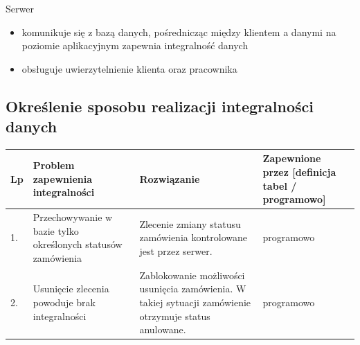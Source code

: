 \documentclass[10pt,a4paper]{article}
\begin{document}
		Serwer
		\begin{itemize}
		  \item komunikuje się z bazą danych, pośrednicząc między klientem a danymi
			 	na poziomie aplikacyjnym zapewnia integralność danych
		  \item obsługuje uwierzytelnienie klienta oraz pracownika
		\end{itemize}

		\newpage
		\subsection{Określenie sposobu realizacji integralności danych}
	    \flushleft
  		\begin{longtable}{| p{0.5cm} | p{4cm} | p{6cm} | p{2cm} |}
  \hline
  Lp & Problem zapewnienia integralności &           Rozwiązanie                 & Zapewnione przez
  																	               [definicja tabel 
  																	               / programowo]\\ \hline
  1. & Przechowywanie w bazie tylko
       określonych statusów zamówienia   &  Zlecenie zmiany statusu zamówienia
         									kontrolowane jest przez serwer.		 & programowo\\ \hline
  2. & Usunięcie zlecenia powoduje
  	   brak integralności				 &  Zablokowanie możliwości usunięcia
  	   										zamówienia. W takiej sytuacji
  	   										zamówienie otrzymuje 
  	   										status anulowane. 					 & programowo\\ \hline
  	   										

\end{longtable}
\end{document}
